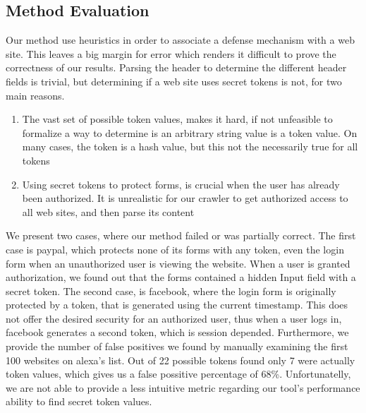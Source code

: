 \subsection{Method Evaluation}
Our method use heuristics in order to associate a defense mechanism with a web site.  This leaves a big margin
for error which renders it difficult to prove the correctness of our results.  Parsing the header to determine the
different header fields is trivial, but determining if a web site uses secret tokens is not, for two main reasons.
\begin{enumerate}
 \item The vast set of possible token values, makes it hard, if not unfeasible to formalize a way to determine 
 is an arbitrary string value is a token value.  On many cases, the token is a hash value, but this not the 
 necessarily true for all tokens
 \item Using secret tokens to protect forms, is crucial when the user has already been authorized.  It 
 is unrealistic for our crawler to get authorized access to all web sites, and then parse its content
\end{enumerate} 
We present two cases, where our method failed or was partially correct.  The first case is paypal, which protects none
of its forms with any token, even the login form when an unauthorized user is viewing the website.  When a user is granted
authorization, we found out that the forms contained a hidden Input field with a secret token.  The second case, is 
facebook, where the login form is originally protected by a token, that is generated using the current timestamp.  This
does not offer the desired security for an authorized user, thus when a user logs in, facebook generates a second 
token, which is session depended.  Furthermore, we provide the number of false positives we found by manually examining 
the first 100 websites on alexa's list. Out of 22 possible tokens found only 7 were actually token values, which gives us 
a false possitive percentage of 68\%.  Unfortunatelly, we are not able to provide a less intuitive metric regarding our tool's
performance ability to find secret token values.

